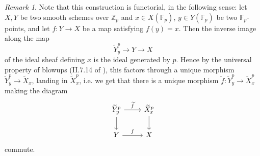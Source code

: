 \documentclass[12pt]{article}
\newcommand{\Z}{\mathbb{Z}}
\newcommand{\F}{\mathbb{F}}
\theoremstyle{plain}
\theoremstyle{definition}
\theoremstyle{remark}
\newtheorem{rem}[thm]{Remark} %
\begin{document}
\begin{rem}
\label{rem:smoothpointsfunc}
Note that this construction is functorial, in the following sense: let $X,Y$ be two smooth schemes over $\Z_p$ and $x\in X(\F_p)$, $y\in Y(\F_p)$ be two $\F_p$-points, and let $f: Y \to X$ be a map satisfying $f(y) = x$. Then the inverse image along the map\[\widetilde{Y}_y^p \to Y \to X\] of the ideal sheaf defining $x$ is the ideal generated by $p$. Hence by the universal property of blowups (II.7.14 of \cite{hartshorne}), this factors through a unique morphism $\widetilde{Y}_y^p \to \widetilde{X}_x$, landing in $\widetilde{X}_x^p$, i.e. we get that there is a unique morphism $\widetilde{f}: \widetilde{Y}_y^p \to \widetilde{X}_x^p$ making the diagram
\[
\begin{tikzcd}
\widetilde{Y}_y^p \arrow[d] \arrow[r,"\widetilde{f}"] & \widetilde{X}_x^p \arrow[d] \\
Y \arrow[r,"f"]              & X  
\end{tikzcd}
\]
commute.
\end{rem}
\end{document}
